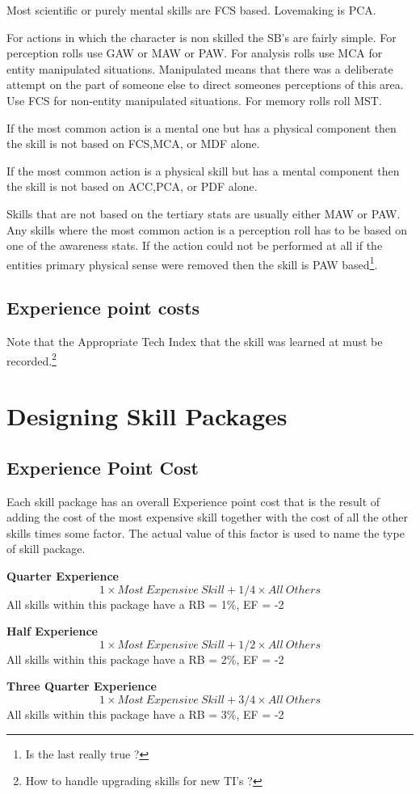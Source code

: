 Most scientific or purely mental skills are FCS based.
Lovemaking is PCA.

For actions in which the character is non skilled the SB's are fairly
simple. For perception rolls use GAW or MAW or PAW. For analysis rolls
use MCA for entity manipulated situations. Manipulated means that there
was a deliberate attempt on the part of someone else to direct someones
perceptions of this area. Use FCS for non-entity manipulated
situations. For memory rolls roll MST.

If the most common action is a mental one but has a physical component then
the skill is not based on FCS,MCA, or MDF alone.

If the most common action is a physical skill but has a mental component then the
skill is not based on ACC,PCA, or PDF alone.

Skills that are not based on the tertiary stats are usually either MAW
or PAW. Any skills where the most common action is a perception roll has
to be based on one of the awareness stats. If the action could not be
performed at all if the entities primary physical sense were removed
then the skill is PAW based\footnote{Is the last really true ?}.



\subsection{Experience point costs}



Note that the Appropriate Tech Index that the skill was learned at
must be recorded.\footnote{ How to handle upgrading skills for new TI's ?}

\section{Designing Skill Packages}

\subsection{Experience Point Cost}

Each skill package has an overall Experience point cost that is
the result of adding the cost of the most expensive skill together
with the cost of all the other skills times some factor. The actual value
of this factor is used to name the type of skill package.

{\bf Quarter Experience}
\[ 1 \times Most\ Expensive\ Skill + 1/4 \times All\ Others \]
All skills within this package have a RB = 1\%, EF = -2

{\bf Half Experience }
\[ 1 \times Most\ Expensive\ Skill + 1/2 \times All\ Others \]
All skills within this package have a RB = 2\%, EF = -2

{\bf Three Quarter Experience}
\[ 1 \times Most\ Expensive\ Skill + 3/4 \times All\ Others \]
All skills within this package have a RB = 3\%, EF = -2



